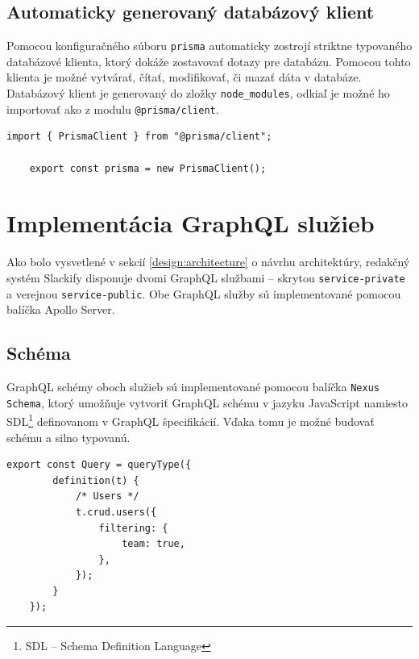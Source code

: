 \section{Automaticky generovaný databázový klient}
Pomocou konfiguračného súboru \texttt{prisma} automaticky zostrojí striktne typovaného databázové klienta, ktorý dokáže zostavovať dotazy pre databázu. Pomocou tohto klienta je možné vytvárať, čítať, modifikovať, či mazať dáta v databáze. \\

\noindent Databázový klient je generovaný do zložky \texttt{node\_modules}, odkiaľ je možné ho importovať ako z modulu \texttt{@prisma/client}. \\

\begin{lstlisting}[caption=Príklad vytvorenia instancie databázového klienta v Slackify.]
	import { PrismaClient } from "@prisma/client";

	export const prisma = new PrismaClient();
\end{lstlisting}



\chapter{Implementácia GraphQL služieb}
Ako bolo vysvetlené v sekcií \ref{design:architecture} o návrhu architektúry, redakčný systém Slackify disponuje dvomi GraphQL službami -- skrytou \texttt{service-private} a verejnou \texttt{service-public}. Obe GraphQL služby sú implementované pomocou balíčka Apollo Server.

\section{Schéma}
GraphQL schémy oboch služieb sú implementované pomocou balíčka \texttt{Nexus Schema}, ktorý umožňuje vytvoriť GraphQL schému v jazyku JavaScript namiesto SDL\footnote{SDL -- Schema Definition Language} definovanom v GraphQL špecifikácií. Vďaka tomu je možné budovať schému  a silno typovanú. \\

\begin{lstlisting}[caption=Časť GraphQL schémy služby \texttt{service-private}., label={impl:code:schema}]
	export const Query = queryType({
		definition(t) {
			/* Users */
			t.crud.users({
				filtering: {
					team: true,
				},
			});
		}
	});
\end{lstlisting}

